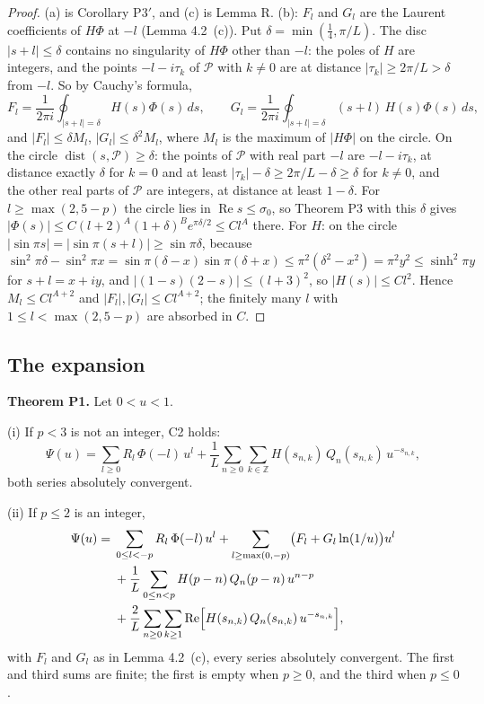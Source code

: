 \documentclass[11pt]{article}
\newcommand{\re}{\operatorname{Re}}
\newcommand{\dist}{\operatorname{dist}}
\begin{document}
\begin{proof}
(a) is Corollary P3$'$, and (c) is Lemma R. (b): $F_l$ and $G_l$ are the Laurent coefficients of $H\Phi$ at $-l$ (Lemma 4.2~(c)). Put $\delta=\min(\frac14,\pi/L)$. The disc $|s+l|\le\delta$ contains no singularity of $H\Phi$ other than $-l$: the poles of $H$ are integers, and the points $-l-i\tau_k$ of $\mathcal{P}$ with $k\ne0$ are at distance $|\tau_k|\ge2\pi/L>\delta$ from $-l$. So by Cauchy's formula,
\[
F_l=\frac{1}{2\pi i}\oint_{|s+l|=\delta}H(s)\Phi(s)\,ds,\qquad G_l=\frac{1}{2\pi i}\oint_{|s+l|=\delta}(s+l)\,H(s)\Phi(s)\,ds,
\]
and $|F_l|\le\delta M_l$, $|G_l|\le\delta^2M_l$, where $M_l$ is the maximum of $|H\Phi|$ on the circle. On the circle $\dist(s,\mathcal{P})\ge\delta$: the points of $\mathcal{P}$ with real part $-l$ are $-l-i\tau_k$, at distance exactly $\delta$ for $k=0$ and at least $|\tau_k|-\delta\ge2\pi/L-\delta\ge\delta$ for $k\ne0$, and the other real parts of $\mathcal{P}$ are integers, at distance at least $1-\delta$. For $l\ge\max(2,5-p)$ the circle lies in $\re s\le\sigma_0$, so Theorem P3 with this $\delta$ gives $|\Phi(s)|\le C(l+2)^A(1+\delta)^Be^{\pi\delta/2}\le Cl^A$ there. For $H$: on the circle $|\sin\pi s|=|\sin\pi(s+l)|\ge\sin\pi\delta$, because $\sin^2\pi\delta-\sin^2\pi x=\sin\pi(\delta-x)\sin\pi(\delta+x)\le\pi^2(\delta^2-x^2)=\pi^2y^2\le\sinh^2\pi y$ for $s+l=x+iy$, and $|(1-s)(2-s)|\le(l+3)^2$, so $|H(s)|\le Cl^2$. Hence $M_l\le Cl^{A+2}$ and $|F_l|,|G_l|\le Cl^{A+2}$; the finitely many $l$ with $1\le l<\max(2,5-p)$ are absorbed in $C$.
\end{proof}

\subsection{The expansion}

\noindent\textbf{Theorem P1.} Let $0<u<1$.

(i) If $p<3$ is not an integer, C2 holds:
\[
\Psi(u)=\sum_{l\ge0}R_l\,\Phi(-l)\,u^l+\frac1L\sum_{n\ge0}\sum_{k\in\mathbb{Z}}H(s_{n,k})\,Q_n(s_{n,k})\,u^{-s_{n,k}},
\]
both series absolutely convergent.

(ii) If $p\le2$ is an integer,
\begin{align*}
\Psi(u)={}&\sum_{0\le l<-p}R_l\,\Phi(-l)\,u^l+\sum_{l\ge\max(0,-p)}\bigl(F_l+G_l\ln(1/u)\bigr)u^l\\
&+\frac1L\sum_{0\le n<p}H(p-n)\,Q_n(p-n)\,u^{n-p}\\
&+\frac2L\sum_{n\ge0}\sum_{k\ge1}\re\Bigl[H(s_{n,k})\,Q_n(s_{n,k})\,u^{-s_{n,k}}\Bigr],
\end{align*}
with $F_l$ and $G_l$ as in Lemma 4.2~(c), every series absolutely convergent. The first and third sums are finite; the first is empty when $p\ge0$, and the third when $p\le0$.
\end{document}
